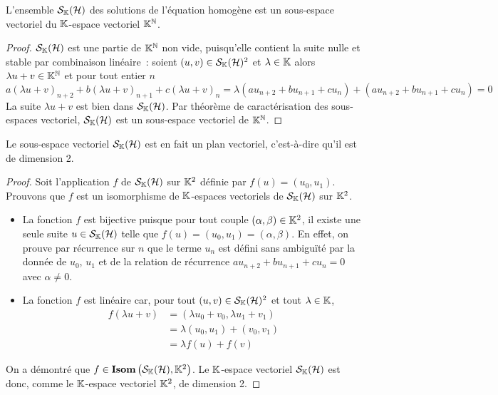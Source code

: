 \begin{prop}
  L'ensemble \(\mathcal{S}_{\mathbb{K}}(\mathcal{H})\) des solutions de l'équation homogène est un 
  sous-espace vectoriel du \(\mathbb{K}\)-espace vectoriel \(\mathbb{K}^{\mathbb{N}}\).
\end{prop}
\begin{proof}
  \(\mathcal{S}_{\mathbb{K}}(\mathcal{H})\) est une partie de \(\mathbb{K}^{\mathbb{N}}\) non vide, puisqu'elle contient la 
  suite nulle et stable par combinaison linéaire~:
  soient \((u,v) \in \mathcal{S}_{\mathbb{K}}(\mathcal{H})^2\) et \(\lambda \in \mathbb{K}\) alors \(\lambda u +v 
  \in \mathbb{K}^{\mathbb{N}}\) et pour tout entier \(n\)
  \begin{equation}
    a(\lambda u+v)_{n+2} +b(\lambda u+v)_{n+1} +c(\lambda u+v)_n = \lambda 
    (au_{n+2}+bu_{n+1}+cu_n) + (au_{n+2}+bu_{n+1}+cu_n)=0
  \end{equation}
  La suite \(\lambda u+v\) est bien dans \(\mathcal{S}_{\mathbb{K}}(\mathcal{H})\). Par théorème de 
  caractérisation des sous-espaces vectoriel, \(\mathcal{S}_{\mathbb{K}}(\mathcal{H})\) est un sous-espace 
  vectoriel de \(\mathbb{K}^{\mathbb{N}}\).
\end{proof}

\begin{prop}
  Le sous-espace vectoriel \(\mathcal{S}_{\mathbb{K}}(\mathcal{H})\) est en fait un plan vectoriel, 
  c'est-à-dire qu'il est de dimension 2.
\end{prop}
\begin{proof}
  Soit l'application \(f\) de \(\mathcal{S}_{\mathbb{K}}(\mathcal{H})\) sur \(\mathbb{K}^2\) définie par 
  \(f(u)=(u_0,u_1)\). Prouvons que \(f\) est un isomorphisme de \(\mathbb{K}\)-espaces 
  vectoriels de \(\mathcal{S}_{\mathbb{K}}(\mathcal{H})\) sur \(\mathbb{K}^2\).
  \begin{itemize}
    \item La fonction \(f\) est bijective puisque pour tout couple \((\alpha, 
      \beta) \in \mathbb{K}^2\), il existe une seule suite \(u \in \mathcal{S}_{\mathbb{K}}(\mathcal{H})\) telle que 
      \(f(u)=(u_0,u_1)=(\alpha,\beta)\). En effet, on prouve par récurrence sur 
      \(n\) que le terme \(u_n\) est défini sans ambiguïté par la donnée de 
      \(u_0\), \(u_1\) et de la relation de récurrence 
      \(au_{n+2}+bu_{n+1}+cu_n=0\) avec \(\alpha \neq 0\).
    \item La fonction \(f\) est linéaire car, pour tout \((u,v) \in 
      \mathcal{S}_{\mathbb{K}}(\mathcal{H})^2\) et tout \(\lambda \in \mathbb{K}\),
      \begin{align}
        f(\lambda u+v) &=(\lambda u_0 +v_0, \lambda u_1+v_1) \\
        &=\lambda (u_0,u_1) +(v_0,v_1)\\
        &=\lambda f(u)+f(v)
      \end{align}
  \end{itemize}
  On a démontré que \(f \in \mathbf{Isom}\left(\mathcal{S}_{\mathbb{K}}(\mathcal{H}),\mathbb{K}^2\right)\). Le \(\mathbb{K}\)-espace vectoriel 
  \(\mathcal{S}_{\mathbb{K}}(\mathcal{H})\) est donc, comme le \(\mathbb{K}\)-espace vectoriel \(\mathbb{K}^2\), de 
  dimension 2.
\end{proof}

